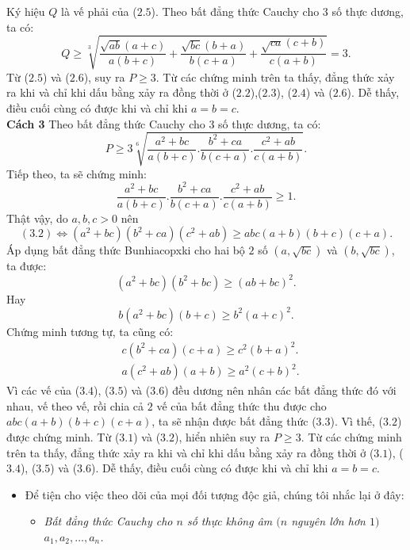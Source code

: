 \begin{bt}
{\noindent Ký hiệu $Q$ là vế phải của ($2.5$). Theo bất đẳng thức Cauchy cho $3$ số thực dương, ta có:
\[Q \geq \sqrt[3]{\dfrac{\sqrt{ab}(a + c)}{a(b + c)} + \dfrac{\sqrt{bc}(b + a)}{b(c + a)} + \dfrac{\sqrt{ca}(c + b)}{c(a + b)}} = 3.\tag{2.6}\] 
\noindent Từ ($2.5$) và ($2.6$), suy ra $P \geq 3$. 
Từ các chứng minh trên ta thấy, đẳng thức xảy ra khi và chỉ khi dấu bằng xảy ra đồng thời ở ($2.2$),($2.3$), ($2.4$) và ($2.6$). Dễ thấy, điều cuối cùng có được khi và chỉ khi $a = b = c$. \\
\noindent \textbf{Cách 3}  Theo bất đẳng thức Cauchy cho $3$ số thực dương, ta có:
\[P \geq 3\sqrt[6]{\dfrac{a^2 + bc}{a(b + c)} . \dfrac{b^2 + ca}{b(c + a)} . \dfrac{c^2 + ab}{c(a + b)}}.\tag{3.1}\]
\noindent Tiếp theo, ta sẽ chứng minh: 
\[\dfrac{a^2 + bc}{a(b + c)} . \dfrac{b^2 + ca}{b(c + a)} . \dfrac{c^2 + ab}{c(a + b)} \geq 1.\tag{3.2}\]
\noindent Thật vậy, do $a, b, c > 0$ nên 
\[(3.2) \Leftrightarrow \left( a^2 + bc\right) \left(b^2 + ca\right) \left(c^2 + ab\right) \geq abc (a + b)(b + c)(c + a). \tag{3.3}\]
\noindent Áp dụng bất đẳng thức Bunhiacopxki cho hai bộ $2$ số $\left(a, \sqrt{bc}\right)$ và $\left(b, \sqrt{bc}\right)$, ta được:
\[\left(a^2 + bc\right)\left(b^2 + bc\right) \geq \left(ab + bc\right)^2.\] 
Hay 
\[b\left(a^2 + bc\right) \left(b + c\right) \geq b^2 \left(a + c\right)^2.\tag{3.4}\]
Chứng minh tương tự, ta cũng có: 
{\allowdisplaybreaks
	\begin{align*}
&c\left(b^2 + ca\right) \left(c + a\right) \geq c^2 \left(b + a\right)^2.\tag{3.5}\\
&a\left(c^2 + ab\right) \left(a + b\right) \geq a^2 \left(c + b\right)^2.\tag{3.6}
\end{align*}}Vì các vế của ($3.4$), ($3.5$) và ($3.6$) đều dương nên nhân các bất đẳng thức đó với nhau, vế theo vế, rồi chia cả $2$ vế của bất đẳng thức thu được cho $abc(a + b)(b + c)(c + a)$, ta sẽ nhận được bất đẳng thức ($3.3$). Vì thế, ($3.2$) được chứng minh. 
Từ ($3.1$) và ($3.2$), hiển nhiên suy ra $P \geq 3$. 
\noindent Từ các chứng minh trên ta thấy, đẳng thức xảy ra khi và chỉ khi dấu bằng xảy ra đồng thời ở ($3.1$), ($3.4$), ($3.5$) và ($3.6$). Dễ thấy, điều cuối cùng có được khi và chỉ khi $a = b = c$.
\begin{nx}\hfill
\begin{itemize}
	\item Để tiện cho việc theo dõi của mọi đối tượng độc giả, chúng tôi nhắc lại ở đây:
\begin{itemize}
	\item \textit{Bất đẳng thức Cauchy cho $n$ số thực không âm $($$n$ nguyên lớn hơn $1$$)$ $a_1, a_2, \ldots , a_n$.}

\end{itemize}
\end{itemize}
\end{nx}}
\end{bt}

